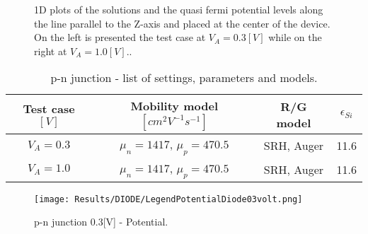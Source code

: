 \begin{figure}[!h]
\centering






\caption{1D plots of the solutions and the quasi fermi potential levels along the line parallel to the Z-axis and placed at the center of the device. On the left is presented the test case at $V_A=0.3[V]$ while on the right at $V_A=1.0[V]$..}
\label{fig: Solutions case test 0.3}
\end{figure}

\begin{table}[!h]
\centering
\begin{tabular}{cccc}
\toprule
 Test case $[V]$ & Mobility model $[cm^2V^{-1}s^{-1}]$ & R/G model & $\epsilon_{Si}$  \\
\midrule
$V_A=0.3$ & $\mu_n = 1417$, $\mu_p = 470.5$ & SRH, Auger & 11.6 \\
$V_A=1.0$ & $\mu_n = 1417$, $\mu_p = 470.5$ & SRH, Auger & 11.6 \\\bottomrule
\end{tabular}
\caption{p-n junction - list of settings, parameters and models.}
\label{tab: diode direct}
\end{table}



\clearpage 

\begin{figure}[!h]
\centering
{}
\hspace{0.06\textwidth}
\hspace{0.04\textwidth}
{\texttt{[image: Results/DIODE/LegendPotentialDiode03volt.png]}}
\caption{p-n junction 0.3[V] - Potential.}
\label{fig: diode potential 03V}
\end{figure}


